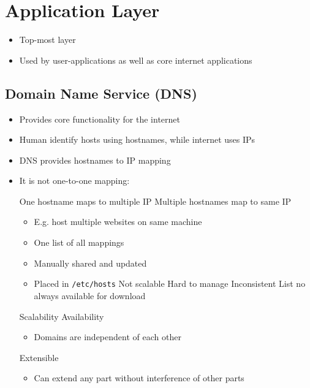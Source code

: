 
\section{Application Layer}
\begin{itemize}
    \item Top-most layer
    \item Used by user-applications as well as core internet applications
\end{itemize}

\subsection{Domain Name Service (DNS)}
\begin{itemize}
    \item Provides core functionality for the internet
    \item Human identify hosts using hostnames, while internet uses IPs
    \item DNS provides hostnames to IP mapping
    \item It is not one-to-one mapping:
        \begin{itemize}
             One hostname maps to multiple IP
             Multiple hostnames map to same IP
                \begin{itemize}
                    \item E.g. host multiple websites on same machine
                \end{itemize}
        \end{itemize}
        \begin{itemize}
            \item One list of all mappings
            \item Manually shared and updated
            \item Placed in \verb+/etc/hosts+
            \icon Not scalable
            \icon Hard to manage
            \icon Inconsistent
            \icon List no always available for download
        \end{itemize}
    \ipro Scalability
    \ipro Availability
        \begin{itemize}
            \item Domains are independent of each other
        \end{itemize}
    \ipro Extensible
        \begin{itemize}
            \item Can extend any part without interference of other parts
        \end{itemize}
\end{itemize}

